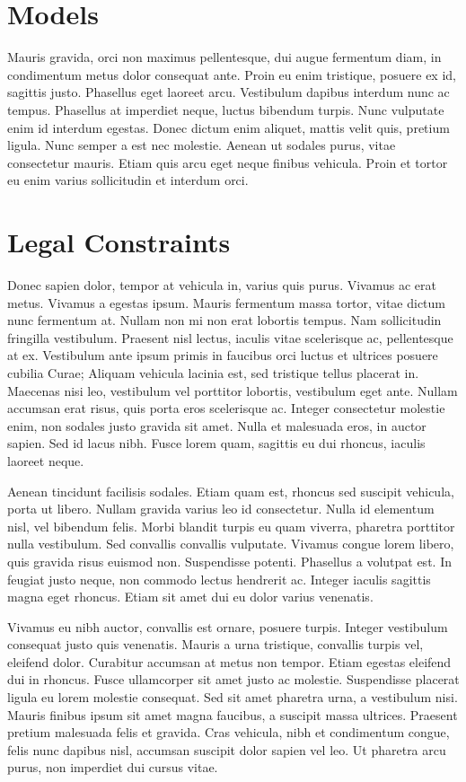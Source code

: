 \documentclass[runningheads]{llncs}
\begin{document}
\section{Models}
Mauris gravida, orci non maximus pellentesque, dui augue fermentum diam, in condimentum metus dolor consequat ante. Proin eu enim tristique, posuere ex id, sagittis justo. Phasellus eget laoreet arcu. Vestibulum dapibus interdum nunc ac tempus. Phasellus at imperdiet neque, luctus bibendum turpis. Nunc vulputate enim id interdum egestas. Donec dictum enim aliquet, mattis velit quis, pretium ligula. Nunc semper a est nec molestie. Aenean ut sodales purus, vitae consectetur mauris. Etiam quis arcu eget neque finibus vehicula. Proin et tortor eu enim varius sollicitudin et interdum orci.

\section{Legal Constraints}
Donec sapien dolor, tempor at vehicula in, varius quis purus. Vivamus ac erat metus. Vivamus a egestas ipsum. Mauris fermentum massa tortor, vitae dictum nunc fermentum at. Nullam non mi non erat lobortis tempus. Nam sollicitudin fringilla vestibulum. Praesent nisl lectus, iaculis vitae scelerisque ac, pellentesque at ex. Vestibulum ante ipsum primis in faucibus orci luctus et ultrices posuere cubilia Curae; Aliquam vehicula lacinia est, sed tristique tellus placerat in. Maecenas nisi leo, vestibulum vel porttitor lobortis, vestibulum eget ante. Nullam accumsan erat risus, quis porta eros scelerisque ac. Integer consectetur molestie enim, non sodales justo gravida sit amet. Nulla et malesuada eros, in auctor sapien. Sed id lacus nibh. Fusce lorem quam, sagittis eu dui rhoncus, iaculis laoreet neque.

Aenean tincidunt facilisis sodales. Etiam quam est, rhoncus sed suscipit vehicula, porta ut libero. Nullam gravida varius leo id consectetur. Nulla id elementum nisl, vel bibendum felis. Morbi blandit turpis eu quam viverra, pharetra porttitor nulla vestibulum. Sed convallis convallis vulputate. Vivamus congue lorem libero, quis gravida risus euismod non. Suspendisse potenti. Phasellus a volutpat est. In feugiat justo neque, non commodo lectus hendrerit ac. Integer iaculis sagittis magna eget rhoncus. Etiam sit amet dui eu dolor varius venenatis.

Vivamus eu nibh auctor, convallis est ornare, posuere turpis. Integer vestibulum consequat justo quis venenatis. Mauris a urna tristique, convallis turpis vel, eleifend dolor. Curabitur accumsan at metus non tempor. Etiam egestas eleifend dui in rhoncus. Fusce ullamcorper sit amet justo ac molestie. Suspendisse placerat ligula eu lorem molestie consequat. Sed sit amet pharetra urna, a vestibulum nisi. Mauris finibus ipsum sit amet magna faucibus, a suscipit massa ultrices. Praesent pretium malesuada felis et gravida. Cras vehicula, nibh et condimentum congue, felis nunc dapibus nisl, accumsan suscipit dolor sapien vel leo. Ut pharetra arcu purus, non imperdiet dui cursus vitae.
\end{document}
